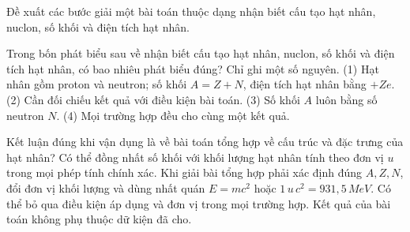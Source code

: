 \begin{bt}
Đề xuất các bước giải một bài toán thuộc dạng nhận biết cấu tạo hạt nhân, nuclon, số khối và điện tích hạt nhân.
\end{bt}

\begin{ex}
Trong bốn phát biểu sau về nhận biết cấu tạo hạt nhân, nuclon, số khối và điện tích hạt nhân, có bao nhiêu phát biểu đúng? Chỉ ghi một số nguyên. (1) Hạt nhân gồm proton và neutron; số khối $A=Z+N$, điện tích hạt nhân bằng $+Ze$. (2) Cần đối chiếu kết quả với điều kiện bài toán. (3) Số khối $A$ luôn bằng số neutron $N$. (4) Mọi trường hợp đều cho cùng một kết quả.
\end{ex}

\begin{ex}
Kết luận đúng khi vận dụng là về bài toán tổng hợp về cấu trúc và đặc trưng của hạt nhân?
\choice
{Có thể đồng nhất số khối với khối lượng hạt nhân tính theo đơn vị $u$ trong mọi phép tính chính xác.}
{\True Khi giải bài tổng hợp phải xác định đúng $A,Z,N$, đổi đơn vị khối lượng và dùng nhất quán $E=mc^2$ hoặc $1\,u\,c^2=931,5\,MeV$.}
{Có thể bỏ qua điều kiện áp dụng và đơn vị trong mọi trường hợp.}
{Kết quả của bài toán không phụ thuộc dữ kiện đã cho.}
\end{ex}

